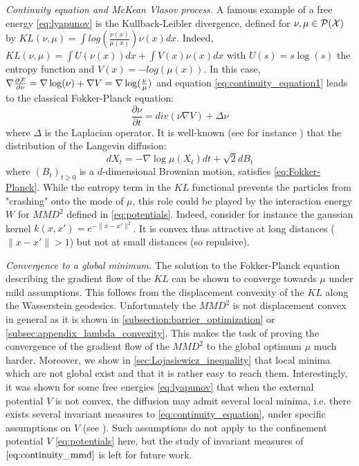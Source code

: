\textit{Continuity equation and McKean Vlasov process.}	A famous example of a free energy \eqref{eq:lyapunov} is the Kullback-Leibler divergence, defined for $\nu, \mu \in \mathcal{P}({{\mathcal X}})$ by
	$KL(\nu,\mu)=\int log(\frac{\nu(x)}{\mu(x)})\nu(x)dx$. Indeed, $KL(\nu, \mu)=\int U(\nu(x))dx + \int V(x) \nu(x)dx$ with $U(s)=s\log(s)$ the entropy function and $V(x)=-log(\mu(x))$. In this case, $\nabla \frac{\partial {{\mathcal F}}}{\partial \nu}= \nabla \log(\nu) + \nabla V=  \nabla \log(\frac{\nu}{\mu})$ and equation \eqref{eq:continuity_equation1} leads to the classical Fokker-Planck equation:
	\begin{equation}\label{eq:Fokker-Planck}
	\frac{\partial{\nu}}{\partial t}= div(\nu \nabla V )+ \Delta \nu
	\end{equation}
	where $\Delta$ is the Laplacian operator. It is well-known (see for instance \cite{jordan1998variational}) that the distribution of the Langevin diffusion:
	\begin{equation}\label{eq:langevin_diffusion}
	dX_t= -\nabla \log \mu (X_t)dt+\sqrt{2}dB_t
	\end{equation}
	where $(B_t)_{t\ge0}$ is a $d$-dimensional Brownian motion, satisfies \eqref{eq:Fokker-Planck}. While the entropy term in the $KL$ functional prevents the particles from "crashing" onto the mode of $\mu$, this role could be played by the interaction energy $W$ for $MMD^2$ defined in \cref{eq:potentials}. Indeed, consider for instance the gaussian kernel $k(x,x')=e^{-\|x-x'\|^2}$. It is convex thus attractive at long distances ($\|x-x'\|>1$) but not at small distances (so repulsive). %
	
	
\textit{Convergence to a global minimum.} The solution to the Fokker-Planck equation describing the gradient flow of the $KL$ can be shown to converge towards $\mu$ under mild assumptions. This follows from the displacement convexity of the $KL$ along the Wasserstein geodesics. Unfortunately the $MMD^2$ is not displacement convex in general as it is shown in \cref{subsection:barrier_optimization} or \cref{subsec:appendix_lambda_convexity}. This makes the task of proving the convergence of the gradient flow of the $MMD^2$ to the global optimum $\mu$ much harder. Moreover, we show in \cref{sec:Lojasiewicz_inequality} that local minima which are not global exist and that it is rather easy to reach them. Interestingly, it was shown for some free energies \eqref{eq:lyapunov} that when the external potential $V$ is not convex, the diffusion may admit several local minima, i.e. there exists several invariant measures to \eqref{eq:continuity_equation}, under specific assumptions on $V$ (see \cite{herrmann2010non,tugaut2014phase}). Such assumptions do not apply to the confinement potential $V$ \eqref{eq:potentials} here, but the study of invariant measures of $\eqref{eq:continuity_mmd}$ is left for future work.

